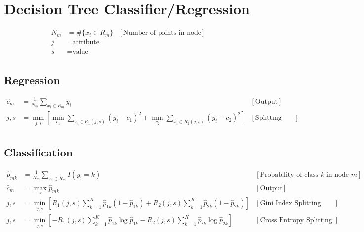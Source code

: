 \section{Decision Tree Classifier/Regression}

\begin{align*}
   N_m &= \#\{x_i \in R_m\} & [\text{Number of points in node}]\\
   j &= \text{attribute} &\\
   s &= \text{value} &\\
\end{align*}

\subsection{Regression}
\begin{align*}
    \hat{c}_m &= \frac{1}{N_m} \sum_{x_i \in R_m} y_i & [\text{Output}]\\
    j, s &= \min_{j, s} \left[\min_{c_1} \sum_{x_i \in R_1 (j, s)} (y_i - c_1)^2 + \min_{c_2} \sum_{x_i \in R_2 (j, s)} (y_i - c_2)^2\right] & [\text{Splitting Condition}]\\
\end{align*}

\subsection{Classification}
\begin{align*}
    \hat{p}_{mk} &= \frac{1}{N_m} \sum_{x_i \in R_m} I(y_i = k) & [\text{Probability of class $k$ in node $m$}]\\
    \hat{c}_m &=  \max_{k} \hat{p}_{mk} & [\text{Output}]\\
    j, s &= \min_{j, s} \left[ R_1 (j, s)\sum^{K}_{k=1} \hat{p}_{1k} (1 - \hat{p}_{1k}) + R_2 (j, s)\sum^{K}_{k=1} \hat{p}_{2k} (1 - \hat{p}_{2k}) \right] & [\text{Gini Index Splitting condition}]\\
    j, s &= \min_{j, s} \left[ -R_1 (j, s)\sum^{K}_{k=1} \hat{p}_{1k} \log \hat{p}_{1k} - R_2 (j, s)\sum^{K}_{k=1} \hat{p}_{2k} \log \hat{p}_{2k} \right] & [\text{Cross Entropy Splitting condition}]\\
\end{align*}
